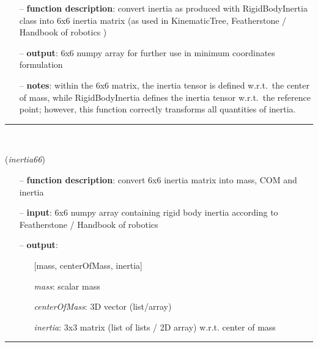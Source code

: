 \begin{itemize}[leftmargin=1.4cm]
\begin{itemize}[leftmargin=0.5cm]
\begin{itemize}[leftmargin=1.4cm]
\begin{itemize}[leftmargin=1.4cm]
\begin{itemize}[leftmargin=0.5cm]
\begin{itemize}[leftmargin=1.4cm]
\begin{itemize}[leftmargin=0.5cm]
\begin{itemize}[leftmargin=1.4cm]
\begin{itemize}[leftmargin=1.4cm]
\begin{itemize}[leftmargin=1.4cm]
\begin{itemize}[leftmargin=0.7cm]
  \item[--]  {\bf function description}: convert inertia as produced with RigidBodyInertia class into 6x6 inertia matrix (as used in KinematicTree, Featherstone / Handbook of robotics \cite{Siciliano2016})  \item[--]  {\bf output}: 6x6 numpy array for further use in minimum coordinates formulation  \item[--]  {\bf notes}: within the 6x6 matrix, the inertia tensor is defined w.r.t.\ the center of mass, while RigidBodyInertia defines the inertia tensor w.r.t.\ the reference point; however, this function correctly transforms all quantities of inertia.\vspace{12pt}\end{itemize}
%
\noindent\rule{8cm}{0.75pt}\vspace{1pt} \\ 
\begin{flushleft}
\label{sec:kinematicTree:Inertia66toMassCOMinertia}
({\it inertia66})
\end{flushleft}
\setlength{\itemindent}{0.7cm}
\begin{itemize}[leftmargin=0.7cm]
  \item[--]  {\bf function description}: convert 6x6 inertia matrix into mass, COM and inertia  \item[--]  {\bf input}: 6x6 numpy array containing rigid body inertia according to Featherstone / Handbook of robotics \cite{Siciliano2016}  \item[--]  {\bf output}: \vspace{-6pt}
  \begin{itemize}[leftmargin=1.2cm]
\setlength{\itemindent}{-0.7cm}
    \item[] [mass, centerOfMass, inertia]
    \item[] {\it   mass}: scalar mass
    \item[] {\it   centerOfMass}: 3D vector (list/array)
    \item[] {\it   inertia}: 3x3 matrix (list of lists / 2D array) w.r.t. center of mass
  \end{itemize}
\vspace{12pt}\end{itemize}
%
\noindent\rule{8cm}{0.75pt}\vspace{1pt} \\ 

\end{itemize}
\end{itemize}
\end{itemize}
\end{itemize}
\end{itemize}
\end{itemize}
\end{itemize}
\end{itemize}
\end{itemize}
\end{itemize}
